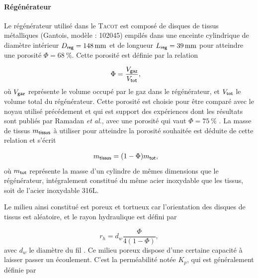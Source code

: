 \paragraph*{Régénérateur} Le régénérateur utilisé dans le \textsc{Tacot} est composé de  disques de tissus métalliques (Gantois, modèle : 102045) empilés dans une enceinte cylindrique de diamètre intérieur $D_{\sf reg}=\qty{148}{\mm}$ et de longueur $L_{\sf reg}=\qty{39}{\mm}$ pour atteindre une porosité $\Phi=\qty{68}{\percent}$. Cette porosité est définie par la relation

\begin{align}
	\Phi &= \frac{V_{\sf gaz}}{V_{\sf tot}}, \label{eq:Porosite_Volume}%
\end{align}
où $V_{\sf gaz}$ représente le volume occupé par le gaz dans le régénérateur, et $V_{\sf tot}$ le volume total du régénérateur. Cette porosité est choisie pour être comparé avec le noyau utilisé précédement et qui est support des expériences dont les résultats sont publiés par Ramadan \textit{et al.}, avec une porosité qui vaut $\Phi=\qty{75}{\percent}$ \cite{ramadan_design_2021}. La masse de tissus $m_{\sf tissus}$ à utiliser pour atteindre la porosité souhaitée est déduite de cette relation et s'écrit 

\begin{align}
	m_{\sf tissus} &= (1-\Phi) m_{\sf tot},
\end{align}
où $m_{\sf tot}$ représente la masse d'un cylindre de mêmes dimensions que le régénérateur, intégralement constitué du même acier inoxydable que les tissus, soit de l'acier inoxydable 316L.

Le milieu ainsi constitué est poreux et tortueux car l'orientation des disques de tissus est aléatoire, et le rayon hydraulique est défini par  %

\begin{equation}
	r_h = d_w\frac{\Phi}{4(1-\Phi)},
	\label{eq:DefRayonHydrauGantois}
\end{equation}
avec $d_w$ le diamètre du fil \cite{swift_thermoacoustics_2017}. Ce milieu poreux dispose d'une certaine capacité à laisser passer un écoulement. C'est la perméabilité notée $K_p$, qui est généralement définie par 

